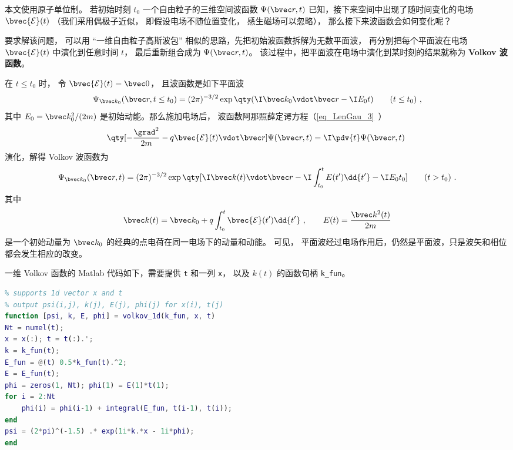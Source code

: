 
本文使用原子单位制。 若初始时刻 $t_0$ 一个自由粒子的三维空间波函数 $\Psi(\bvec r,t)$ 已知，接下来空间中出现了随时间变化的电场 $\bvec {\mathcal E}(t)$ （我们采用偶极子近似， 即假设电场不随位置变化， 感生磁场可以忽略）， 那么接下来波函数会如何变化呢？

要求解该问题， 可以用 “一维自由粒子高斯波包” 相似的思路，先把初始波函数拆解为无数平面波， 再分别把每个平面波在电场 $\bvec {\mathcal E}(t)$ 中演化到任意时间 $t$， 最后重新组合成为 $\Psi(\bvec r,t)$。 该过程中，把平面波在电场中演化到某时刻的结果就称为 \textbf{Volkov 波函数}。

在 $t \le t_0$ 时， 令 $\bvec {\mathcal E}(t) = \bvec 0$， 且波函数是如下平面波
\begin{equation}\label{eq_Volkov_3}
\Psi_{\bvec k_0}(\bvec r, t \le t_0) = (2\pi)^{-3/2} \exp\qty(\I\bvec k_0 \vdot \bvec r - \I E_0 t) \qquad (t \le t_0)~,
\end{equation}
其中 $E_0 = \bvec k_0^2/(2m)$ 是初始动能。那么施加电场后，
波函数阿那照薛定谔方程（\autoref{eq_LenGau_3}~）
\begin{equation}
\qty[-\frac{\grad^2}{2m} - q \bvec {\mathcal E}(t) \vdot \bvec r] \Psi(\bvec r,t) = \I \pdv{t} \Psi(\bvec r,t)~
\end{equation}
演化，解得 Volkov 波函数为
\begin{equation}\label{eq_Volkov_4}
\Psi_{\bvec k_0}(\bvec r, t) = (2\pi)^{-3/2} \exp\qty[\I \bvec k(t)\vdot \bvec r - \I\int_{t_0}^t E(t') \dd{t'} - \I E_0 t_0] \qquad (t > t_0)~.
\end{equation}
其中
\begin{equation}\label{eq_Volkov_5}
\bvec k(t) = \bvec k_0 + q\int_{t_0}^t \bvec {\mathcal E}(t') \dd{t'}~,
\qquad
E(t) = \frac{\bvec k^2(t)}{2m}
\end{equation}
是一个初始动量为 $\bvec k_0$ 的经典的点电荷在同一电场下的动量和动能。 可见， 平面波经过电场作用后，仍然是平面波，只是波矢和相位都会发生相应的改变。

一维 Volkov 函数的 Matlab 代码如下，需要提供 \verb`t` 和一列 \verb`x`， 以及 $k(t)$ 的函数句柄 \verb`k_fun`。
\begin{lstlisting}[language=matlab, caption=volkov\_1d.m]
% Volkov wave function in 1D
% supports 1d vector x and t
% output psi(i,j), k(j), E(j), phi(j) for x(i), t(j)
function [psi, k, E, phi] = volkov_1d(k_fun, x, t)
Nt = numel(t);
x = x(:); t = t(:).';
k = k_fun(t);
E_fun = @(t) 0.5*k_fun(t).^2;
E = E_fun(t);
phi = zeros(1, Nt); phi(1) = E(1)*t(1);
for i = 2:Nt
    phi(i) = phi(i-1) + integral(E_fun, t(i-1), t(i));
end
psi = (2*pi)^(-1.5) .* exp(1i*k.*x - 1i*phi);
end
\end{lstlisting}

